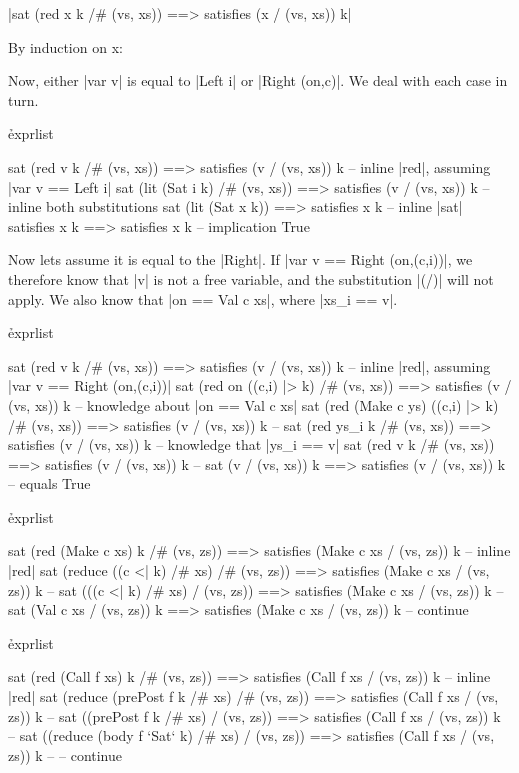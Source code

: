 
{|sat (red x k /# (vs, xs)) ==> satisfies (x / (vs, xs)) k|}

By induction on x:


Now, either |var v| is equal to |Left i| or |Right (on,c)|. We deal with each case in turn.

\h{exprlist}\begin{code}
sat (red v k /# (vs, xs)) ==> satisfies (v / (vs, xs)) k
    -- inline |red|, assuming |var v == Left i|
sat (lit (Sat i k) /# (vs, xs)) ==> satisfies (v / (vs, xs)) k
    -- inline both substitutions
sat (lit (Sat x k)) ==> satisfies x k
    -- inline |sat|
satisfies x k ==> satisfies x k
    -- implication
True
\end{code}

Now lets assume it is equal to the |Right|. If |var v == Right (on,(c,i))|, we therefore know that |v| is not a free variable, and the substitution |(/)| will not apply. We also know that |on == Val c xs|, where |xs_i == v|.

\h{exprlist}\begin{code}
sat (red v k /# (vs, xs)) ==> satisfies (v / (vs, xs)) k
    -- inline |red|, assuming |var v == Right (on,(c,i))|
sat (red on ((c,i) |> k) /# (vs, xs)) ==> satisfies (v / (vs, xs)) k
    -- knowledge about |on == Val c xs|
sat (red (Make c ys) ((c,i) |> k) /# (vs, xs)) ==> satisfies (v / (vs, xs)) k
    -- \lemma{| ||> |}
sat (red ys_i k /# (vs, xs)) ==> satisfies (v / (vs, xs)) k
    -- knowledge that |ys_i == v|
sat (red v k /# (vs, xs)) ==> satisfies (v / (vs, xs)) k
    -- 
sat (v / (vs, xs)) k ==> satisfies (v / (vs, xs)) k
    -- equals
True
\end{code}


\h{exprlist}\begin{code}
sat (red (Make c xs) k /# (vs, zs)) ==> satisfies (Make c xs / (vs, zs)) k
    -- inline |red|
sat (reduce ((c <| k) /# xs) /# (vs, zs)) ==> satisfies (Make c xs / (vs, zs)) k
    -- 
sat (((c <| k) /# xs) / (vs, zs)) ==> satisfies (Make c xs / (vs, zs)) k
    -- 
sat (Val c xs / (vs, zs)) k ==> satisfies (Make c xs / (vs, zs)) k
    -- continue
\end{code}


\h{exprlist}\begin{code}
sat (red (Call f xs) k /# (vs, zs)) ==> satisfies (Call f xs / (vs, zs)) k
    -- inline |red|
sat (reduce (prePost f k /# xs) /# (vs, zs)) ==> satisfies (Call f xs / (vs, zs)) k
    -- 
sat ((prePost f k /# xs) / (vs, zs)) ==> satisfies (Call f xs / (vs, zs)) k
    -- 
sat ((reduce (body f `Sat` k) /# xs) / (vs, zs)) ==> satisfies (Call f xs / (vs, zs)) k
    -- 
    -- continue
\end{code}

